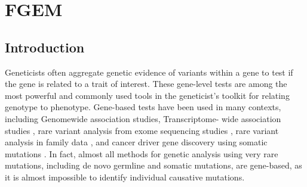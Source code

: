 
\chapter{FGEM}




\section{Introduction}\label{sec:org28fe636}

Geneticists often aggregate genetic evidence of variants within a gene to test if the gene is related to a trait of interest. These gene-level tests are among the most powerful and commonly used tools in the geneticist's toolkit for relating genotype to phenotype.
Gene-based tests have been used in many contexts, including Genomewide association studies, Transcriptome- wide association studies \cite{predixcan}, rare variant analysis from exome sequencing studies \cite{skat}, rare variant analysis in family data \cite{TADA}, and cancer driver gene discovery using somatic mutations \cite{drivermaps}. In fact, almost all methods for genetic analysis using very rare mutations, including de novo germline and somatic mutations, are gene-based, as it is almost impossible to identify individual causative mutations. %

